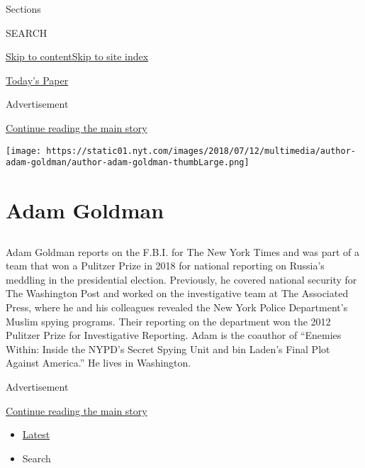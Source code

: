 Sections

SEARCH

\protect\hyperlink{site-content}{Skip to
content}\protect\hyperlink{site-index}{Skip to site index}

\href{https://myaccount.nytimes.com/auth/login?response_type=cookie\&client_id=vi}{}

\href{https://www.nytimes.com/section/todayspaper}{Today's Paper}

Advertisement

\protect\hyperlink{after-top}{Continue reading the main story}

\texttt{[image: https://static01.nyt.com/images/2018/07/12/multimedia/author-adam-goldman/author-adam-goldman-thumbLarge.png]}

\hypertarget{adam-goldman}{%
\section{Adam Goldman}\label{adam-goldman}}

\subsection{}

Adam Goldman reports on the F.B.I. for The New York Times and was part
of a team that won a Pulitzer Prize in 2018 for national reporting on
Russia's meddling in the presidential election. Previously, he covered
national security for The Washington Post and worked on the
investigative team at The Associated Press, where he and his colleagues
revealed the New York Police Department's Muslim spying programs. Their
reporting on the department won the 2012 Pulitzer Prize for
Investigative Reporting. Adam is the coauthor of ``Enemies Within:
Inside the NYPD's Secret Spying Unit and bin Laden's Final Plot Against
America.'' He lives in Washington.

Advertisement

\protect\hyperlink{after-mid1}{Continue reading the main story}

\begin{itemize}
\tightlist
\item
  \protect\hyperlink{stream-panel}{Latest}
\item
  Search
\end{itemize}

